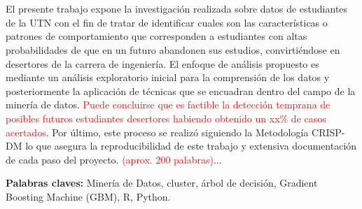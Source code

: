 \chapter*{\runtitulo}

\noindent El presente trabajo expone la investigación realizada sobre datos de estudiantes de la UTN  con el fin de tratar de identificar cuales son las características o patrones de comportamiento que corresponden a estudiantes con altas probabilidades de que en un futuro abandonen sus estudios, convirtiéndose en desertores de la carrera de ingeniería. El enfoque de análisis propuesto es mediante un análisis exploratorio inicial para la comprensión de los datos y posteriormente la aplicación de técnicas que se encuadran dentro del campo de la minería de datos. \textcolor{red}{Puede concluirse que es factible la detección temprana de posibles futuros estudiantes desertores habiendo obtenido un xx\% de casos acertados}. Por último, este proceso se realizó siguiendo la Metodología CRISP-DM lo que asegura la reproducibilidad de este trabajo y extensiva documentación de cada paso del proyecto.
\textcolor{red}{(aprox. 200 palabras)}...

\bigskip

\noindent\textbf{Palabras claves:} Minería de Datos, cluster, árbol de decisión, Gradient Boosting Machine (GBM), R, Python.


